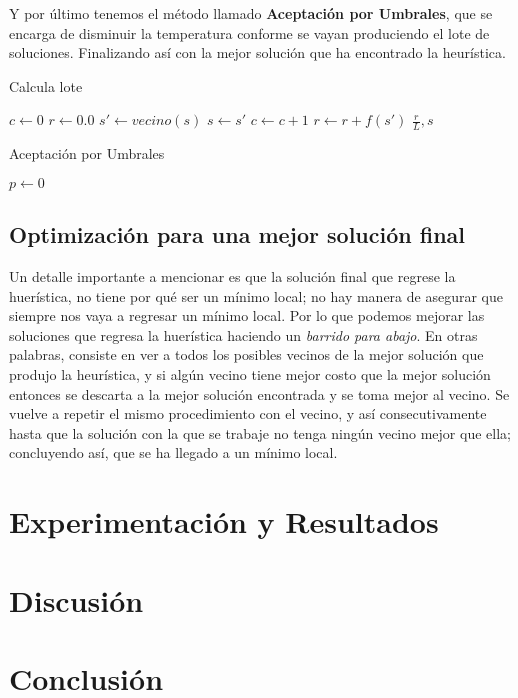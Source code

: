 \documentclass{article}
\newcommand{\tbf}[1]{\textbf{#1}}
\newcommand{\tit}[1]{\textit{#1}}
\begin{document}
  Y por último tenemos el método llamado \tbf{Aceptación por 
  Umbrales}, que se encarga de disminuir la temperatura conforme
  se vayan produciendo el lote de soluciones. Finalizando así
  con la mejor solución que ha encontrado la heurística. \\

  \begin{algorithm}[H]
    \caption{Calcula lote}
    \SetAlgoLined
    $c \leftarrow 0$\;
    $r \leftarrow 0.0$\;
     {
      $s' \leftarrow vecino(s)$\;
       {
        $s \leftarrow s'$\;
        $c \leftarrow c + 1$\;
        $r \leftarrow r + f(s')$\;
      }
    }
    \Return $\frac{r}{L}, s$\;
  \end{algorithm}

  \begin{algorithm}[H]
    \caption{Aceptación por Umbrales}
    \SetAlgoLined
    $p \leftarrow 0$\;
  \end{algorithm}
  
  \subsection{Optimización para una mejor solución final}

  Un detalle importante a mencionar es que la solución final
  que regrese la huerística, no tiene por qué ser un mínimo 
  local; no hay manera de asegurar que siempre nos vaya a 
  regresar un mínimo local. Por lo que podemos mejorar las 
  soluciones que regresa la huerística haciendo un \tit{barrido
  para abajo}. En otras palabras, consiste en ver a todos los 
  posibles vecinos de la mejor solución que produjo la heurística,
  y si algún vecino tiene mejor costo que la mejor solución entonces
  se descarta a la mejor solución encontrada y se toma mejor al vecino.
  Se vuelve a repetir el mismo procedimiento con el vecino, y así 
  consecutivamente hasta que la solución con la que se trabaje no tenga 
  ningún vecino mejor que ella; concluyendo así, que se ha llegado a 
  un mínimo local.

  \section{Experimentación y Resultados} \label{results}

  \section{Discusión} \label{discussion}

  \section{Conclusión} \label{conclussion}
  
\end{document}
